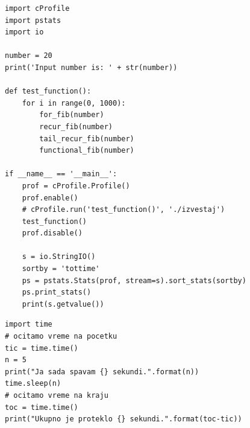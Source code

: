 \documentclass[a4paper]{article}
\begin{document}
\begin{lstlisting}[caption={Kod korišćen za testiranje modula cProfile i pstats},frame=single, label=lst:cprofile_pstats, ]
import cProfile
import pstats
import io

number = 20
print('Input number is: ' + str(number))

def test_function():
    for i in range(0, 1000):
        for_fib(number)
        recur_fib(number)
        tail_recur_fib(number)
        functional_fib(number)

if __name__ == '__main__':
    prof = cProfile.Profile()
    prof.enable()
    # cProfile.run('test_function()', './izvestaj')
    test_function()
    prof.disable()

    s = io.StringIO()
    sortby = 'tottime'
    ps = pstats.Stats(prof, stream=s).sort_stats(sortby)
    ps.print_stats()
    print(s.getvalue())
\end{lstlisting}

\newpage

\begin{lstlisting}[caption={Primer profajliranja korišćenjem modula {\em time}}, frame=single, label=lst:kod_time]
import time
# ocitamo vreme na pocetku
tic = time.time()
n = 5
print("Ja sada spavam {} sekundi.".format(n))
time.sleep(n)
# ocitamo vreme na kraju
toc = time.time()
print("Ukupno je proteklo {} sekundi.".format(toc-tic))
\end{lstlisting}

\begin{table}[h!]
 \begin{center}
 \caption{Karakteristike računara na kojima je pokretan kod \ref{lbl:cmodule_test}}
 \vspace{6pt}
\label{table:performance}
\end{center}
\end{table}
\end{document}
